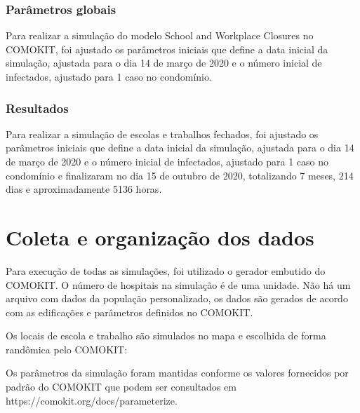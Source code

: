 \subsubsection{Parâmetros globais}

Para realizar a simulação do modelo School and Workplace Closures no COMOKIT, foi ajustado os parâmetros iniciais que define a data inicial da simulação, ajustada para o dia 14 de março de 2020 e o número inicial de infectados, ajustado para 1 caso no condomínio.


\subsubsection{Resultados}

Para realizar a simulação de escolas e trabalhos fechados, foi ajustado os parâmetros iniciais que define a data inicial da simulação, ajustada para o dia 14 de março de 2020 e o número inicial de infectados, ajustado para 1 caso no condomínio e finalizaram no dia 15 de outubro de 2020, totalizando 7 meses, 214 dias e aproximadamente 5136 horas.



\section{Coleta e organização dos dados}

Para execução de todas as simulações, foi utilizado o gerador embutido do COMOKIT. O número de hospitais na simulação é de uma unidade. Não há um arquivo com dados da população personalizado, os dados são gerados de acordo com as edificações e parâmetros definidos no COMOKIT.

Os locais de escola e trabalho são simulados no mapa e escolhida de forma randômica pelo COMOKIT:


Os parâmetros da simulação foram mantidas conforme os valores fornecidos por padrão do COMOKIT que podem ser consultados em https://comokit.org/docs/parameterize.

